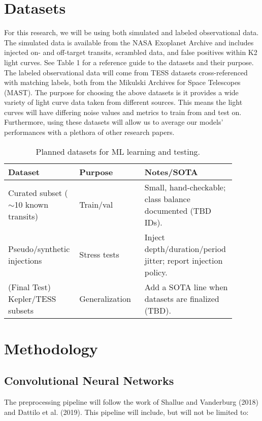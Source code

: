 \documentclass[letterpaper]{article} %
\begin{document}
\section*{Datasets}
For this research, we will be using both simulated and labeled observational data. The simulated data is available from the NASA Exoplanet Archive and includes injected on- and off-target transits, scrambled data, and false positives within K2 light curves. See Table 1 for a reference guide to the datasets and their purpose. The labeled observational data will come from TESS datasets cross-referenced with matching labels, both from the Mikulski Archives for Space Telescopes (MAST). The purpose for choosing the above datasets is it provides a wide variety of light curve data taken from different sources. This means the light curves will have differing noise values and metrics to train from and test on. Furthermore, using these datasets will allow us to average our models' performances with a plethora of other research papers.

\begin{table}[t]
\centering
\begin{tabular}{p{0.28\linewidth} p{0.28\linewidth} p{0.33\linewidth}}
\hline
\textbf{Dataset} & \textbf{Purpose} & \textbf{Notes/SOTA} \\ \hline
Curated subset ($\sim$10 known transits) & Train/val & Small, hand-checkable; class balance documented (TBD IDs). \\
Pseudo/synthetic injections & Stress tests & Inject depth/duration/period jitter; report injection policy. \\
(Final Test) Kepler/TESS subsets & Generalization & Add a SOTA line when datasets are finalized (TBD). \\ \hline
\end{tabular}
\caption{{Planned datasets for ML learning and testing.}}
\label{{tab:datasets}}
\end{table}

\section*{Methodology}
\subsection*{Convolutional Neural Networks}
The preprocessing pipeline will follow the work of Shallue and Vanderburg (2018) and Dattilo et al. (2019). This pipeline will include, but will not be limited to:
\end{document}

